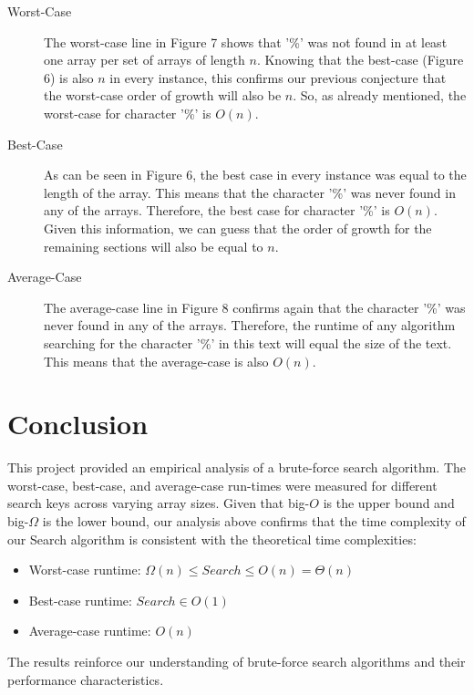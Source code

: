 \documentclass{article}
\begin{document}
\begin{description}
    \item[Worst-Case] The worst-case line in Figure 7 shows that '\%' was not found in at least one array per set of arrays of length $n$. Knowing that the best-case (Figure 6) is also $n$ in every instance, this confirms our previous conjecture that the worst-case order of growth will also be $n$. So, as already mentioned, the worst-case for character '\%' is $O(n)$.
    \item[Best-Case] As can be seen in Figure 6, the best case in every instance was equal to the length of the array. This means that the character '\%' was never found in any of the arrays. Therefore, the best case for character '\%' is $O(n)$. Given this information, we can guess that the order of growth for the remaining sections will also be equal to $n$.
    \item[Average-Case] The average-case line in Figure 8 confirms again that the character '\%' was never found in any of the arrays. Therefore, the runtime of any algorithm searching for the character '\%' in this text will equal the size of the text. This means that the average-case is also $O(n)$.
\end{description}

\section{Conclusion}
This project provided an empirical analysis of a brute-force search algorithm. The worst-case, best-case, and average-case run-times were measured for different search keys across varying array sizes. Given that big-$O$ is the upper bound and big-$\Omega$ is the lower bound, our analysis above confirms that the time complexity of our Search algorithm is consistent with the theoretical time complexities:
	
    \begin{itemize}
        \item Worst-case runtime: \( \Omega(n) \leq Search \leq O(n) = \Theta(n) \)
	\item Best-case runtime: \( Search \in O(1) \)
	\item Average-case runtime: \( O(n) \)
    \end{itemize}
    
The results reinforce our understanding of brute-force search algorithms and their performance characteristics.
\end{document}
